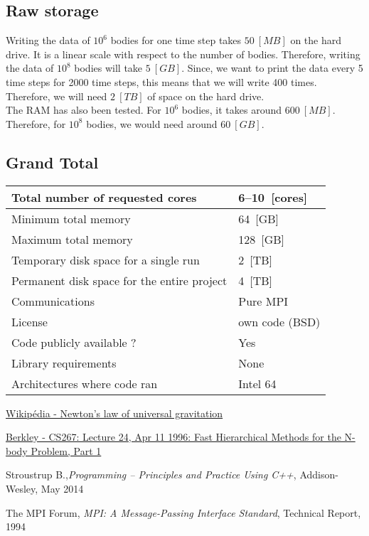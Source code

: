 \documentclass[10pt,a4paper]{article}
\begin{document}
\subsection{Raw storage}

Writing the data of $10^6$ bodies for one time step takes $50~[MB]$ on the hard drive. It is a linear scale with respect to the number of bodies. Therefore, writing the data of $10^8$ bodies will take $5~[GB]$. Since, we want to print the data every 5 time steps for 2000 time steps, this means that we will write 400 times. Therefore, we will need $2~[TB]$ of space on the hard drive. 
\\
The RAM has also been tested. For $10^6$ bodies, it takes around $600~[MB]$. Therefore, for $10^8$ bodies, we would need around $60~[GB]$.

\subsection{Grand Total}

\begin{center}
\begin{tabular}{| l | l |}
	\hline
	Total number of requested cores & 6--10~[cores] \\
	\hline
	Minimum total memory & 64~[GB] \\
	\hline
	Maximum total memory & 128~[GB] \\
	\hline
	Temporary disk space for a single run & 2~[TB] \\
	\hline
	Permanent disk space for the entire project & 4~[TB] \\
	\hline
	Communications & Pure MPI \\
	\hline
	License & own code (BSD) \\
	\hline
	Code publicly available ? & Yes \\
	\hline
	Library requirements & None \\
	\hline
	Architectures where code ran & Intel 64 \\
	\hline
\end{tabular}
\end{center}

\begin{thebibliography}{1}

 \href{https://en.wikipedia.org/wiki/Newton's\_law\_of\_universal\_gravitation}{Wikip\'edia - Newton's law of universal gravitation}

 \href{http://http.cs.berkeley.edu/~demmel/cs267/lecture26/lecture26.html}{Berkley - CS267: Lecture 24, Apr 11 1996: Fast Hierarchical Methods for the N-body Problem, Part 1}

 Stroustrup B.,{\em Programming -- Principles and Practice Using C++}, Addison-Wesley, May 2014

 The MPI Forum, {\em MPI: A Message-Passing Interface Standard}, Technical Report, 1994

\end{thebibliography}
\end{document}
